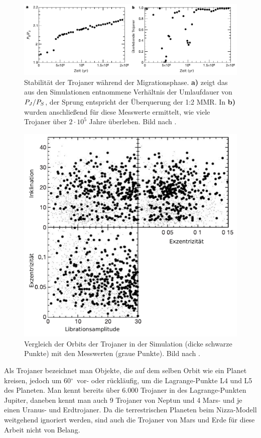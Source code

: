 \documentclass[12pt,a4paper,twoside]{article}
\renewcommand{\cite}{\citep}
\newcommand{\degree}{$^\circ$}
\begin{document}
\begin{figure}
\centering 
\includegraphics[scale=1]{img/Morbidelli2005-1v}
\caption{Stabilität der Trojaner während der Migrationsphase. \textbf{a)} zeigt das aus den Simulationen entnommene Verhältnis der Umlaufdauer von $P_J/P_S$, der Sprung entspricht der Überquerung der 1:2 MMR. In \textbf{b)} wurden anschließend für diese Messwerte ermittelt, wie viele Trojaner über $2\cdot10^5$ Jahre überleben. Bild nach \cite{Morbidelli2005}.}
\label{fig:Trojanerstabilitaet}
\end{figure}
\begin{figure}
\centering 
\includegraphics[scale=1]{img/Morbidelli2005-2}
\caption{Vergleich der Orbits der Trojaner in der Simulation (dicke schwarze Punkte) mit den Messwerten (graue Punkte). Bild nach \cite{Morbidelli2005}.}
\label{fig:Trojanerorbitale}
\end{figure}
Als Trojaner bezeichnet man Objekte, die auf dem selben Orbit wie ein Planet kreisen, jedoch um 60\degree\ vor- oder rückläufig, um die Lagrange-Punkte L4 und L5 des Planeten. 
Man kennt bereits über 6.000 Trojaner in des Lagrange-Punkten Jupiter, daneben kennt man auch 9 Trojaner von Neptun und 4 Mars- und je einen Uranus- und Erdtrojaner\cite{IAU14}.
Da die terrestrischen Planeten beim Nizza-Modell weitgehend ignoriert werden, sind auch die Trojaner von Mars und Erde für diese Arbeit nicht von Belang.
\end{document}
